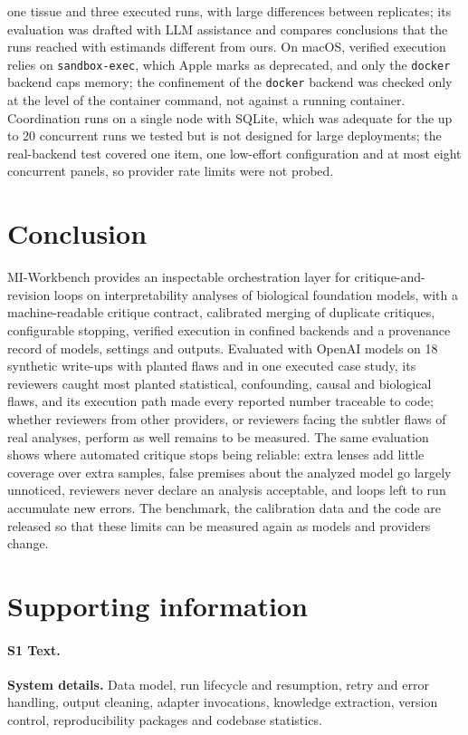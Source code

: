 \documentclass[10pt,letterpaper]{article}
\begin{document}
one tissue and three executed runs, with large differences between replicates; its evaluation was drafted with LLM assistance and compares conclusions that the runs reached with estimands different from ours. On macOS, verified execution relies on \texttt{sandbox-exec}, which Apple marks as deprecated, and only the \texttt{docker} backend caps memory; the confinement of the \texttt{docker} backend was checked only at the level of the container command, not against a running container. Coordination runs on a single node with SQLite, which was adequate for the up to 20 concurrent runs we tested but is not designed for large deployments; the real-backend test covered one item, one low-effort configuration and at most eight concurrent panels, so provider rate limits were not probed.


\section*{Conclusion}
MI-Workbench provides an inspectable orchestration layer for critique-and-revision loops on interpretability analyses of biological foundation models, with a machine-readable critique contract, calibrated merging of duplicate critiques, configurable stopping, verified execution in confined backends and a provenance record of models, settings and outputs. Evaluated with OpenAI models on 18 synthetic write-ups with planted flaws and in one executed case study, its reviewers caught most planted statistical, confounding, causal and biological flaws, and its execution path made every reported number traceable to code; whether reviewers from other providers, or reviewers facing the subtler flaws of real analyses, perform as well remains to be measured. The same evaluation shows where automated critique stops being reliable: extra lenses add little coverage over extra samples, false premises about the analyzed model go largely unnoticed, reviewers never declare an analysis acceptable, and loops left to run accumulate new errors. The benchmark, the calibration data and the code are released so that these limits can be measured again as models and providers change.


\section*{Supporting information}
\paragraph*{S1 Text.}
\label{S1_Text}
{\bf System details.} Data model, run lifecycle and resumption, retry and error handling, output cleaning, adapter invocations, knowledge extraction, version control, reproducibility packages and codebase statistics.
\end{document}
